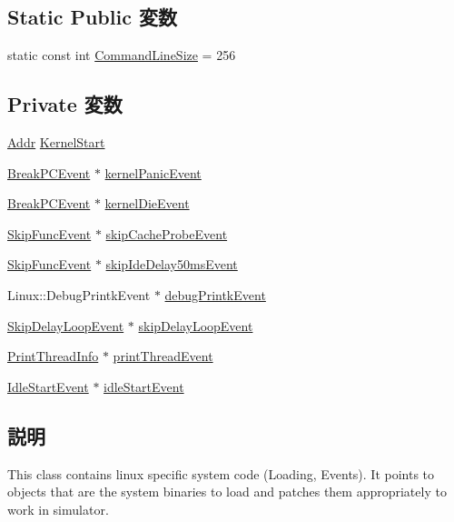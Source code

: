 \subsection*{Static Public 変数}
\begin{DoxyCompactItemize}
\item 
static const int \hyperlink{classLinuxMipsSystem_a40cf7cde1351c066dee545df2832e4c7}{CommandLineSize} = 256
\end{DoxyCompactItemize}
\subsection*{Private 変数}
\begin{DoxyCompactItemize}
\item 
\hyperlink{base_2types_8hh_af1bb03d6a4ee096394a6749f0a169232}{Addr} \hyperlink{classLinuxMipsSystem_a586fffad970b7236ceaab6d5cb3eb9d0}{KernelStart}
\item 
\hyperlink{classBreakPCEvent}{BreakPCEvent} $\ast$ \hyperlink{classLinuxMipsSystem_aa052aa785f60b08b9c27dfe6838686e4}{kernelPanicEvent}
\item 
\hyperlink{classBreakPCEvent}{BreakPCEvent} $\ast$ \hyperlink{classLinuxMipsSystem_a84afa728bab9addbfe1a66374c9093b5}{kernelDieEvent}
\item 
\hyperlink{classSkipFuncEvent}{SkipFuncEvent} $\ast$ \hyperlink{classLinuxMipsSystem_aa2dee1f9674e5ea129c2c31d05ce6412}{skipCacheProbeEvent}
\item 
\hyperlink{classSkipFuncEvent}{SkipFuncEvent} $\ast$ \hyperlink{classLinuxMipsSystem_accb807c7d7a32466eb9f7ddf7e07d582}{skipIdeDelay50msEvent}
\item 
Linux::DebugPrintkEvent $\ast$ \hyperlink{classLinuxMipsSystem_aedceac66468548dd7c74a37cb968a83b}{debugPrintkEvent}
\item 
\hyperlink{classLinuxMipsSystem_1_1SkipDelayLoopEvent}{SkipDelayLoopEvent} $\ast$ \hyperlink{classLinuxMipsSystem_a9cab420f2dc7381c4c07941ff49c8167}{skipDelayLoopEvent}
\item 
\hyperlink{classLinuxMipsSystem_1_1PrintThreadInfo}{PrintThreadInfo} $\ast$ \hyperlink{classLinuxMipsSystem_ad433ad9dba393cab0cb0b67f6d3d58ab}{printThreadEvent}
\item 
\hyperlink{classIdleStartEvent}{IdleStartEvent} $\ast$ \hyperlink{classLinuxMipsSystem_a063da82d4b5c3e8ea09eeb1d65d0666e}{idleStartEvent}
\end{DoxyCompactItemize}


\subsection{説明}
This class contains linux specific system code (Loading, Events). It points to objects that are the system binaries to load and patches them appropriately to work in simulator. 

